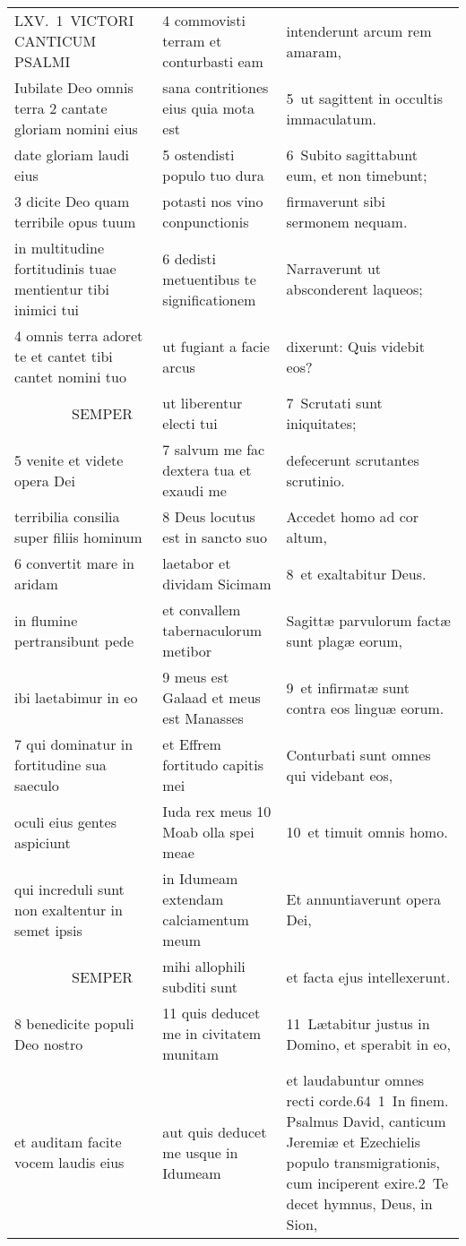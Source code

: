 \documentclass{article}
\begin{document}
\begin{longtable}{@{}p{}p{}p{}@{}}
LXV. 1 VICTORI CANTICUM PSALMI	&	4 commovisti terram et conturbasti eam	&	intenderunt arcum rem amaram,	\\
Iubilate Deo omnis terra 2 cantate gloriam nomini eius	&	sana contritiones eius quia mota est	&	5 ut sagittent in occultis immaculatum.	\\
date gloriam laudi eius	&	5 ostendisti populo tuo dura	&	6 Subito sagittabunt eum, et non timebunt;	\\
3 dicite Deo quam terribile opus tuum	&	potasti nos vino conpunctionis	&	firmaverunt sibi sermonem nequam.	\\
in multitudine fortitudinis tuae mentientur tibi inimici tui	&	6 dedisti metuentibus te significationem	&	Narraverunt ut absconderent laqueos;	\\
4 omnis terra adoret te et cantet tibi cantet nomini tuo	&	ut fugiant a facie arcus	&	dixerunt: Quis videbit eos?	\\
    SEMPER	&	ut liberentur electi tui	&	7 Scrutati sunt iniquitates;	\\
5 venite et videte opera Dei	&	7 salvum me fac dextera tua et exaudi me	&	defecerunt scrutantes scrutinio.	\\
terribilia consilia super filiis hominum	&	8 Deus locutus est in sancto suo	&	Accedet homo ad cor altum,	\\
6 convertit mare in aridam	&	laetabor et dividam Sicimam	&	8 et exaltabitur Deus.	\\
in flumine pertransibunt pede	&	et convallem tabernaculorum metibor	&	Sagittæ parvulorum factæ sunt plagæ eorum,	\\
ibi laetabimur in eo	&	9 meus est Galaad et meus est Manasses	&	9 et infirmatæ sunt contra eos linguæ eorum.	\\
7 qui dominatur in fortitudine sua saeculo	&	et Effrem fortitudo capitis mei	&	Conturbati sunt omnes qui videbant eos,	\\
oculi eius gentes aspiciunt	&	Iuda rex meus 10 Moab olla spei meae	&	10 et timuit omnis homo.	\\
qui increduli sunt non exaltentur in semet ipsis	&	in Idumeam extendam calciamentum meum	&	Et annuntiaverunt opera Dei,	\\
    SEMPER	&	mihi allophili subditi sunt	&	et facta ejus intellexerunt.	\\
8 benedicite populi Deo nostro	&	11 quis deducet me in civitatem munitam	&	11 Lætabitur justus in Domino, et sperabit in eo,	\\
et auditam facite vocem laudis eius	&	aut quis deducet me usque in Idumeam	&	et laudabuntur omnes recti corde.64 1 In finem. Psalmus David, canticum Jeremiæ et Ezechielis populo transmigrationis, cum inciperent exire.2 Te decet hymnus, Deus, in Sion,	\\

\end{longtable}
\end{document}
